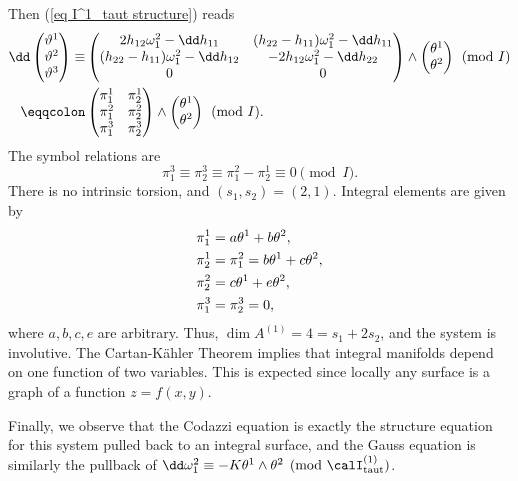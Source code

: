 \begin{example}
    Then (\ref{eq I^1_taut structure}) reads
    \begin{align}
        \dd \begin{pmatrix}
            \vartheta^1\\
            \vartheta^2\\
            \vartheta^3
        \end{pmatrix}
        \equiv& \begin{pmatrix}
            2h_{12}\omega^2_1-\dd h_{11} & (h_{22}-h_{11})\omega^2_1-\dd  h_{11}\\
            (h_{22}-h_{11})\omega^2_1-\dd h_{12} & -2h_{12}\omega^2_1-\dd h_{22}\\
            0 & 0\\
        \end{pmatrix}\wedge 
        \begin{pmatrix}
            \theta^1\\
            \theta^2
        \end{pmatrix}\pmod{I} \notag \\
        \eqqcolon& 
        \begin{pmatrix}
            \pi^1_1 & \pi^1_2\\
            \pi^2_1 & \pi^2_2\\
            \pi^3_1 & \pi^3_2
        \end{pmatrix}\wedge 
        \begin{pmatrix}
            \theta^1\\
            \theta^2
        \end{pmatrix}\pmod{I}.
    \end{align}
    The symbol relations are 
    \[\pi^3_1\equiv \pi^3_2\equiv \pi^2_1-\pi^1_2\equiv 0\pmod{I}.\]
    There is no intrinsic torsion, and $(s_1,s_2)=(2,1)$. Integral elements are given by 
    \begin{align}
        \pi^1_1&=a\theta^1+b\theta^2,\notag\\
        \pi^1_2&=\pi^2_1=b\theta^1+c\theta^2,\notag\\
        \pi^2_2&=c\theta^1+e\theta^2,\notag\\
        \pi^3_1&=\pi^3_2=0,
    \end{align}
    where $a,b,c,e$ are arbitrary. Thus, $\dim A^{(1)}=4=s_1+2s_2$, and the system is involutive. The Cartan-K\"ahler Theorem implies that integral manifolds depend on one function of two variables. This is expected since locally any surface is a graph of a function $z=f(x,y)$. 
    
    Finally, we observe that the Codazzi equation is exactly the structure equation for this system pulled back to an integral surface, and the Gauss equation is similarly the pullback of $\dd\omega^2_1\equiv- K\theta^1\wedge\theta^2\pmod{\calI_{\mathrm{taut}}^{(1)}}$.
\end{example}

